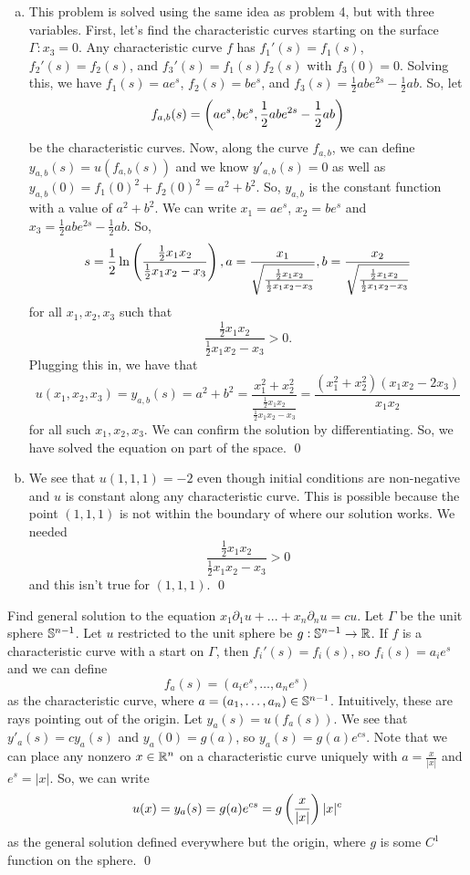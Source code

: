 \documentclass{article}
\renewcommand{\d}{\partial}
\begin{document}
\tri
\hop
\solution
\begin{enumerate}[(a)]
    \item This problem is solved using the same idea as problem 4, but with three variables. First, let's find the characteristic curves starting on the surface $\Gamma: x_3 = 0$. 
    Any characteristic curve $f$ has $f_1'(s) = f_1(s)$, $f_2'(s) = f_2(s)$, and $f_3'(s) = f_1(s)f_2(s)$ with $f_3(0) = 0$. 
    \hop 
    Solving this, we have $f_1(s) = ae^s$, $f_2(s)=be^s$, and $f_3(s)=\frac{1}{2}abe^{2s}-\frac{1}{2}ab$. So, let 
    \[f_{a,b}(s) = \del{ae^s, be^s,\frac{1}{2}abe^{2s}-\frac{1}{2}ab}\]
    be the characteristic curves. Now, along the curve $f_{a,b}$, we can define $y_{a,b}(s) = u(f_{a,b}(s))$ and we know $y'_{a,b}(s) = 0$ as well as $y_{a,b}(0) = f_1(0)^2 + f_2(0)^2 = a^2+b^2$. So, $y_{a,b}$ is the constant function with a value of $a^2 + b^2$. 
    \hop 
    We can write $x_1 = ae^s$, $x_2 = be^s$ and $x_3=\frac{1}{2}abe^{2s}-\frac{1}{2}ab$. So,
    \[s = \frac{1}{2}\ln\del{\frac{\frac{1}{2}x_1x_2}{\frac{1}{2}x_1x_2-x_3}}, a = \frac{x_1}{\sqrt{\frac{\frac{1}{2}x_1x_2}{\frac{1}{2}x_1x_2-x_3}}}, b = \frac{x_2}{\sqrt{\frac{\frac{1}{2}x_1x_2}{\frac{1}{2}x_1x_2-x_3}}}\]
    for all $x_1,x_2,x_3$ such that 
    \[\frac{\frac{1}{2}x_1x_2}{\frac{1}{2}x_1x_2-x_3} > 0.\]
    Plugging this in, we have that 
    \[u(x_1, x_2, x_3) = y_{a,b}(s)=a^2+b^2 = \frac{x_1^2 + x_2^2}{\frac{\frac{1}{2}x_1x_2}{\frac{1}{2}x_1x_2-x_3}} = \frac{(x_1^2+x_2^2)(x_1x_2-2x_3)}{x_1x_2}\]
    for all such $x_1, x_2,x_3$. We can confirm the solution by differentiating. So, we have solved the equation on part of the space. \qed
    \item We see that $u(1,1,1) = -2$ even though initial conditions are non-negative and $u$ is constant along any characteristic curve. This is possible because the point $(1,1,1)$ is not within the boundary of where our solution works. We needed
    \[\frac{\frac{1}{2}x_1x_2}{\frac{1}{2}x_1x_2-x_3} > 0\]
    and this isn't true for $(1,1,1)$. \qed
\end{enumerate}

\newpage
{} Find general solution to the equation $x_1\d_1u + ... + x_n\d_nu = cu$. \tri
\hop
\solution Let $\Gamma$ be the unit sphere $\mathbb{S}^{n-1}$. Let $u$ restricted to the unit sphere be $g: \mathbb{S}^{n-1} \to \mathbb{R}$. If $f$ is a characteristic curve with a start on $\Gamma$, then $f_i'(s) = f_i(s)$, so $f_i(s) = a_ie^s$ and we can define
\[f_a(s)=(a_ie^s, \dots, a_ne^s)\]
as the characteristic curve, where $a = (a_1, \dots, a_n) \in \mathbb{S}^{n-1}$. Intuitively, these are rays pointing out of the origin. Let $y_a(s)=u(f_a(s))$. We see that $y'_a(s) = cy_a(s)$ and $y_a(0) = g(a)$, so $y_a(s) = g(a)e^{cs}$. 
\hop
Note that we can place any nonzero $x \in \mathbb{R}^n$ on a characteristic curve uniquely with $a = \frac{x}{|x|}$ and $e^s = |x|$. So, we can write 
\[u(x) = y_a(s) = g(a)e^{cs} = g\del{\frac{x}{|x|}}|x|^c\]
as the general solution defined everywhere but the origin, where $g$ is some $C^1$ function on the sphere. \qed
\end{document}
